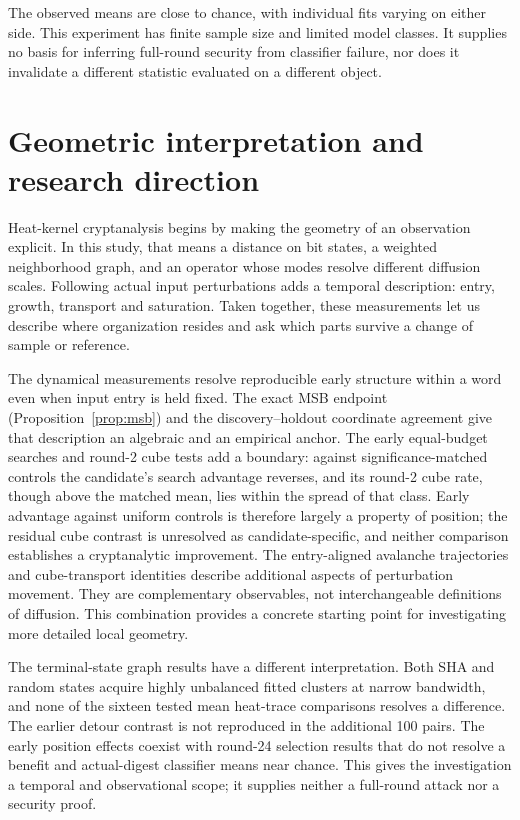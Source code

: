 \documentclass[11pt]{article}
\begin{document}
The observed means are close to chance, with individual fits varying on either side. This experiment has finite sample size and limited model classes. It supplies no basis for inferring full-round security from classifier failure, nor does it invalidate a different statistic evaluated on a different object.

\section{Geometric interpretation and research direction}
Heat-kernel cryptanalysis begins by making the geometry of an observation explicit. In this study, that means a distance on bit states, a weighted neighborhood graph, and an operator whose modes resolve different diffusion scales. Following actual input perturbations adds a temporal description: entry, growth, transport and saturation. Taken together, these measurements let us describe where organization resides and ask which parts survive a change of sample or reference.

The dynamical measurements resolve reproducible early structure within a word even when input entry is held fixed. The exact MSB endpoint (Proposition~\ref{prop:msb}) and the discovery--holdout coordinate agreement give that description an algebraic and an empirical anchor. The early equal-budget searches and round-2 cube tests add a boundary: against significance-matched controls the candidate's search advantage reverses, and its round-2 cube rate, though above the matched mean, lies within the spread of that class. Early advantage against uniform controls is therefore largely a property of position; the residual cube contrast is unresolved as candidate-specific, and neither comparison establishes a cryptanalytic improvement. The entry-aligned avalanche trajectories and cube-transport identities describe additional aspects of perturbation movement. They are complementary observables, not interchangeable definitions of diffusion. This combination provides a concrete starting point for investigating more detailed local geometry.

The terminal-state graph results have a different interpretation. Both SHA and random states acquire highly unbalanced fitted clusters at narrow bandwidth, and none of the sixteen tested mean heat-trace comparisons resolves a difference. The earlier detour contrast is not reproduced in the additional 100 pairs. The early position effects coexist with round-24 selection results that do not resolve a benefit and actual-digest classifier means near chance. This gives the investigation a temporal and observational scope; it supplies neither a full-round attack nor a security proof.
\end{document}
